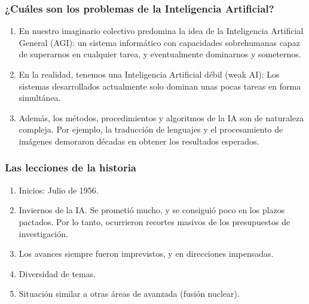 \documentclass[11pt]{beamer}
\begin{document}
    \begin{frame}
    	\frametitle{¿Cuáles son los problemas de la Inteligencia Artificial?}
    	
    	\begin{enumerate}
            \item En nuestro imaginario colectivo predomina la idea de la Inteligencia Artificial General (AGI): un sistema informático con capacidades sobrehumanas capaz de superarnos en cualquier tarea, y eventualmente dominarnos y someternos.
            \item En la realidad, tenemos una Inteligencia Artificial débil (weak AI): Los sistemas desarrollados actualmente solo dominan unas pocas tareas en forma simultánea.
            \item Además, los métodos, procedimientos y algoritmos de la IA son de naturaleza compleja. Por ejemplo, la traducción de lenguajes y el procesamiento de imágenes demoraron décadas en obtener los resultados esperados.
    	\end{enumerate}
    \end{frame}
 
    \begin{frame}
    	\frametitle{Las lecciones de la historia}
    	
    	\begin{enumerate}
    		\item Inicios: Julio de 1956.
    		\item Inviernos de la IA. Se prometió mucho, y se consiguió poco en los plazos pactados. Por lo tanto, ocurrieron recortes masivos de los presupuestos de investigación.
    		\item Los avances siempre fueron imprevistos, y en direcciones impensadas. 
    		\item Diversidad de temas. 
    		\item Situación similar a otras áreas de avanzada (fusión nuclear).
    	\end{enumerate}
    \end{frame}
\end{document}
